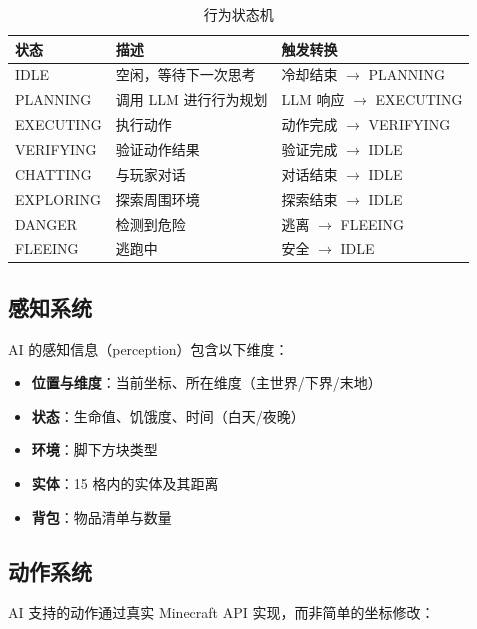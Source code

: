 \documentclass[12pt,a4paper]{article}
\begin{document}
\begin{table}[H]
\centering
\caption{行为状态机}
\label{tab:states}
\begin{tabular}{@{}lll@{}}
\toprule
\textbf{状态} & \textbf{描述} & \textbf{触发转换} \\
\midrule
IDLE & 空闲，等待下一次思考 & 冷却结束 $\rightarrow$ PLANNING \\
PLANNING & 调用 LLM 进行行为规划 & LLM 响应 $\rightarrow$ EXECUTING \\
EXECUTING & 执行动作 & 动作完成 $\rightarrow$ VERIFYING \\
VERIFYING & 验证动作结果 & 验证完成 $\rightarrow$ IDLE \\
CHATTING & 与玩家对话 & 对话结束 $\rightarrow$ IDLE \\
EXPLORING & 探索周围环境 & 探索结束 $\rightarrow$ IDLE \\
DANGER & 检测到危险 & 逃离 $\rightarrow$ FLEEING \\
FLEEING & 逃跑中 & 安全 $\rightarrow$ IDLE \\
\bottomrule
\end{tabular}
\end{table}

\subsection{感知系统}

AI 的感知信息（perception）包含以下维度：

\begin{itemize}
    \item \textbf{位置与维度}：当前坐标、所在维度（主世界/下界/末地）
    \item \textbf{状态}：生命值、饥饿度、时间（白天/夜晚）
    \item \textbf{环境}：脚下方块类型
    \item \textbf{实体}：15 格内的实体及其距离
    \item \textbf{背包}：物品清单与数量
\end{itemize}

\subsection{动作系统}

AI 支持的动作通过真实 Minecraft API 实现，而非简单的坐标修改：
\end{document}
